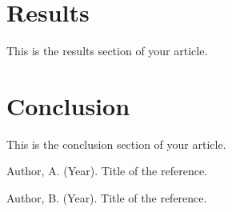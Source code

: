 \documentclass[12pt]{article}
\begin{document}
\section{Results}
This is the results section of your article.

\section{Conclusion}
This is the conclusion section of your article.

\begin{thebibliography}{9}
Author, A. (Year). Title of the reference.

Author, B. (Year). Title of the reference.
\end{thebibliography}
\end{document}
